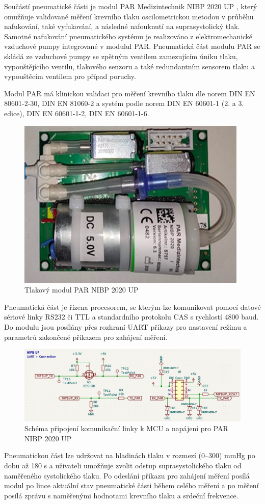 Součástí pneumatické části je modul PAR Medizintechnik NIBP 2020 UP , který omužňuje validované měření krevního tlaku oscilometrickou metodou v průběhu nafukování, také vyfukování, a následné nafouknutí na suprasystolický tlak. Samotné nafukování pneumatického systému je realizováno z elektromechanické vzduchové pumpy integrované v modulul PAR.
Pneumatická část modulu PAR se skládá ze vzduchové pumpy se zpětným ventilem zamezujícím úniku tlaku, vypouštějícího ventilu, tlakového senzoru a také redundantním sensorem tlaku a vypouštěcím ventilem pro případ poruchy. \par
Modul PAR má klinickou validaci pro měření krevního tlaku dle norem DIN EN 80601-2-30, DIN EN 81060-2 a systém podle norem DIN EN 60601-1 (2. a 3. edice), DIN EN 60601-1-2, DIN EN 60601-1-6.
\begin{figure}[H]
    \centering
    \includegraphics{pictures/par_nibp_up.jpg}
    \caption{Tlakový modul PAR NIBP 2020 UP}
    \label{fig:par_modul}
\end{figure}

Pneumatická část je řízena procesorem, se kterým lze komunikovat pomocí datové sériové linky RS232 či TTL a standardního protokolu CAS s rychlostí 4800 baud. Do modulu jsou posílány přes rozhraní UART příkazy pro nastavení režimu a parametrů zakončené příkazem pro zahájení měření.
\begin{figure}[H]
    \centering
    \includegraphics[width=0.9\linewidth]{pictures/nibpup_connection.jpg}
    \caption{Schéma připojení komunikační linky k MCU a napájení pro PAR NIBP 2020 UP }
    \label{fig:par_modul_comm}
\end{figure}
Pneumatickou část lze udržovat na hladinách tlaku v rozmezí (0–300) mmHg po dobu až 180 s a uživateli umožňuje zvolit odstup suprasystolického tlaku od naměřeného systolického tlaku. Po odeslání příkazu pro zahájení měření posílá modul po lince aktuální stav pneumatické části během celého měření a po měření posílá zprávu s naměřenými hodnotami krevního tlaku a srdeční frekvence.
